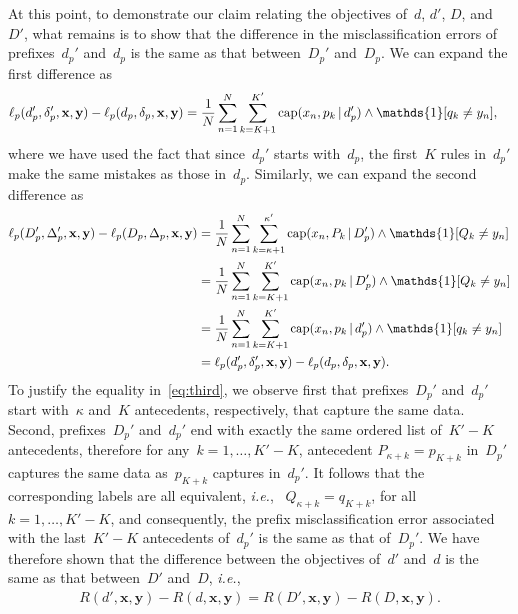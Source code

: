 \documentclass[twoside,11pt]{article}
\def\ie{{\it i.e.},~}
\def\one{\mathds{1}}
\newcommand{\x}{\mathbf{x}}
\newcommand{\y}{\mathbf{y}}
\def\RL{{d}}
\def\Prefix{d_p}
\def\Labels{\delta_p}
\def\RLB{{D}}
\def\PrefixB{D_p}
\def\LabelsB{\Delta_p}
\def\Obj{R}
\def\Loss{\ell}
\def\Cap{\textnormal{cap}}
\def\one{\mathds{1}}
\newcommand{\nn}{\nonumber}
\newcommand{\given}{\,|\,}
\begin{document}
At this point, to demonstrate our claim relating the objectives
of~$\RL$, $\RL'$, $\RLB$, and~$\RLB'$, what remains is to
show that the difference in the misclassification errors
of prefixes~$\Prefix'$ and~$\Prefix$ is the same as that
between~$\PrefixB'$ and~$\PrefixB$.
%
We can expand the first difference as
\begin{align}
\Loss_p(\Prefix', \Labels', \x, \y) - \Loss_p(\Prefix, \Labels, \x, \y)
&= \frac{1}{N} \sum_{n=1}^N \sum_{k=K+1}^{K'}
  \Cap(x_n, p_k \given \Prefix') \wedge \one [ q_k \neq y_n ], \nn
\end{align}
where we have used the fact that since~$\Prefix'$
starts with~$\Prefix$, the first~$K$ rules in~$\Prefix'$
make the same mistakes as those in~$\Prefix$.
%
Similarly, we can expand the second difference as
\begin{align}
\Loss_p(\PrefixB', \LabelsB', \x, \y) - \Loss_p(\PrefixB, \LabelsB, \x, \y)
&= \frac{1}{N} \sum_{n=1}^N \sum_{k=\kappa+1}^{\kappa'}
  \Cap(x_n, P_k \given \PrefixB') \wedge \one [ Q_k \neq y_n ] \nn \\
&= \frac{1}{N} \sum_{n=1}^N \sum_{k=K+1}^{K'}
  \Cap(x_n, p_k \given \PrefixB') \wedge \one [ Q_k \neq y_n ] \nn \\
&= \frac{1}{N} \sum_{n=1}^N \sum_{k=K+1}^{K'}
  \Cap(x_n, p_k \given \Prefix') \wedge \one [ q_k \neq y_n ] \label{eq:third} \\
&= \Loss_p(\Prefix', \Labels', \x, \y) - \Loss_p(\Prefix, \Labels, \x, \y) \nn.
\end{align}
To justify the equality in~\eqref{eq:third}, we observe first that
prefixes~$\PrefixB'$ and~$\Prefix'$ start with~$\kappa$ and~$K$
antecedents, respectively, that capture the same data.
%
Second, prefixes~$\PrefixB'$ and~$\Prefix'$ end with exactly
the same ordered list of~${K' - K}$ antecedents,
therefore for any~${k = 1, \dots, K' - K}$,
antecedent ${P_{\kappa + k} = p_{K + k}}$ in~$\PrefixB'$
captures the same data as~$p_{K + k}$ captures in~$\Prefix'$.
%
It follows that the corresponding labels are all equivalent, \ie
${Q_{\kappa + k} = q_{K + k}}$, for all~${k = 1, \dots, K' - K}$,
and consequently, the prefix misclassification error associated
with the last~${K' - K}$ antecedents of~$\Prefix'$ is the same
as that of~$\PrefixB'$.
%
We have therefore shown that the difference between the objectives
of~$\RL'$ and~$\RL$ is the same as that between~$\RLB'$ and~$\RLB$, \ie
\begin{align}
\Obj(\RL', \x, \y) - \Obj(\RL, \x, \y)
= \Obj(\RLB', \x, \y) - \Obj(\RLB, \x, \y).
\label{eq:equiv-analogous}
\end{align}
\end{document}
